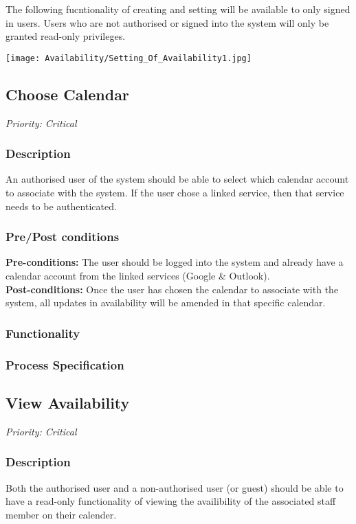 The following fucntionality of creating and setting will be available to only signed in users. Users who are not authorised or signed into the system will only be granted read-only privileges.

\texttt{[image: Availability/Setting\_Of\_Availability1.jpg]}


\subsection{Choose Calendar}
\textit{Priority: Critical}
	\subsubsection{Description}
	An authorised user of the system should be able to select which calendar account to associate with the system. If the user chose a linked service, then that service needs to be authenticated.\\
	\subsubsection{Pre/Post conditions}
		\textbf{Pre-conditions:} The user should be logged into the system and already have a calendar account from the linked services (Google \& Outlook). \\
		\textbf{Post-conditions:} Once the user has chosen the calendar to associate with the system, all updates in availability will be amended in that specific calendar.
	\subsubsection{Functionality}
	\subsubsection{Process Specification}

\subsection{View Availability}
\textit{Priority: Critical}
	\subsubsection{Description}
	Both the authorised user and a non-authorised user (or guest) should be able to have a read-only functionality of viewing the availibility of the associated staff member on their calender.\\
